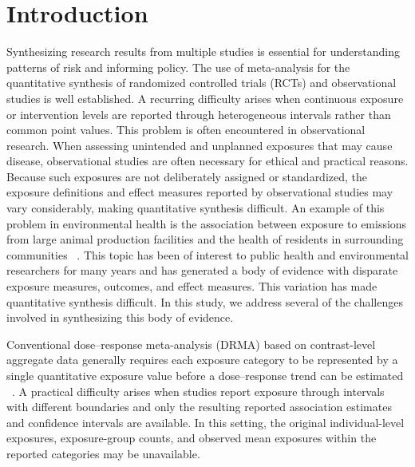 \documentclass[journal=rsm]{CUP-JNL-DTM}%
\theoremstyle{definition}
\numberwithin{equation}{section}
\begin{document}


\section{Introduction}\label{sec1}

Synthesizing research results from multiple studies is essential for
understanding patterns of risk and informing policy. The use of meta-analysis
for the quantitative synthesis of randomized controlled trials (RCTs) and
observational studies is well established. A recurring difficulty arises when
continuous exposure or intervention levels are reported through heterogeneous
intervals rather than common point values. This problem is often encountered in
observational research. When assessing unintended and unplanned exposures that
may cause disease, observational studies are often necessary for ethical and
practical reasons. Because such exposures are not deliberately assigned or
standardized, the exposure definitions and effect measures reported by
observational studies may vary considerably, making quantitative synthesis
difficult. An example of this
problem in environmental health is the association between exposure to
emissions from large animal production facilities and the health of residents
in surrounding communities
~\cite{OConnor_A_M2010,OConnor_A_M2017}. This topic has been of interest
to public health and environmental researchers for many years and has generated
a body of evidence with disparate exposure measures, outcomes, and effect
measures. This variation has made quantitative synthesis difficult. In this
study, we address several of the challenges involved in synthesizing this body
of evidence.

Conventional dose--response meta-analysis (DRMA) based on contrast-level
aggregate data generally requires each exposure category to be represented by a single
quantitative exposure value before a dose--response trend can be estimated
~\cite{Greenland1992,Orsini2012}. A practical difficulty arises when studies
report exposure through intervals with different boundaries and only the resulting reported association estimates and confidence intervals
are available.
In this setting, the original individual-level exposures, exposure-group
counts, and observed mean exposures within the reported categories may be
unavailable.
\end{document}
